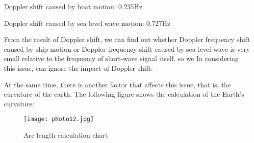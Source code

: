 \documentclass{mcmthesis}
\begin{document}
Doppler shift caused by boat motion: 0.235Hz

Doppler shift caused by sea level wave motion: 0.727Hz


From the result of Doppler shift, we can find out whether Doppler frequency shift caused by ship motion or Doppler frequency shift caused by sea level wave is very small relative to the frequency of short-wave signal itself, so we In considering this issue, can ignore the impact of Doppler shift.

At the same time, there is another factor that affects this issue, that is, the curvature of the earth. The following figure shows the calculation of the Earth's curvature:

\begin{figure}[h]
\small
\centering
\texttt{[image: photo12.jpg]}
\caption{Arc length calculation chart} \label{fig:aa}
\end{figure}
\end{document}
